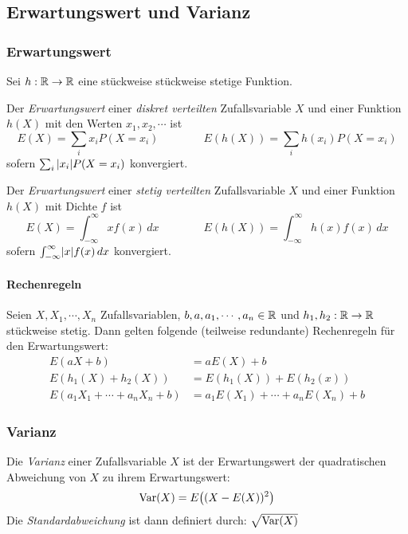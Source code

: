 		\subsection{Erwartungswert und Varianz}
			\subsubsection{Erwartungswert}
				Sei \( h : \mathbb{R} \rightarrow \mathbb{R} \) eine stückweise stückweise stetige Funktion.

				Der \textit{Erwartungswert} einer \textit{diskret verteilten} Zufallsvariable \(X\) und einer Funktion \( h(X) \) mit den Werten \( x_1, x_2, \cdots \) ist
				\begin{equation*}
					E(X) = \sum_{i} x_i P(X = x_i) \qquad\qquad E(h(X)) = \sum_i h(x_i) P(X = x_i)
				\end{equation*}
				sofern \( \sum_i \abs{x_i} P(X = x_i) \) konvergiert.

				Der \textit{Erwartungswert} einer \textit{stetig verteilten} Zufallsvariable \(X\) und einer Funktion \( h(X) \) mit Dichte \(f\) ist
				\begin{equation*}
					E(X) = \int_{-\infty}^{\infty} \! x f(x) \, dx \qquad\qquad E(h(X)) = \int_{-\infty}^{\infty} \! h(x) f(x) \, dx
				\end{equation*}
				sofern \( \int_{-\infty}^{\infty} \! \abs{x} f(x) \, dx \) konvergiert.

				\paragraph{Rechenregeln}
					Seien \(X, X_1, \cdots, X_n\) Zufallsvariablen, \( b, a, a_1, \cdots, a_n \in \mathbb{R} \) und \( h_1, h_2 : \mathbb{R} \rightarrow \mathbb{R} \) stückweise stetig. Dann gelten folgende (teilweise redundante) Rechenregeln für den Erwartungswert:
					\begin{align*}
						E(aX + b)                       & = aE(X) + b                          \\
						E(h_1(X) + h_2(X))              & = E(h_1(X)) + E(h_2(x))              \\
						E(a_1X_1 + \cdots + a_nX_n + b) & = a_1E(X_1) + \cdots + a_nE(X_n) + b
					\end{align*}

			\subsubsection{Varianz}
				Die \textit{Varianz} einer Zufallsvariable \(X\) ist der Erwartungswert der quadratischen Abweichung von \(X\) zu ihrem Erwartungswert:
				\begin{equation*}
					\operatorname{Var}(X) = E\big( (X - E(X)) ^ 2 \big)
				\end{equation*}
				Die \textit{Standardabweichung} ist dann definiert durch: \( \sqrt{\operatorname{Var}(X)} \)

